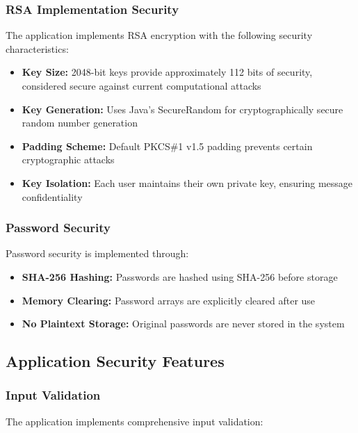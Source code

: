 \documentclass[12pt,a4paper]{article}
\begin{document}
\subsubsection{RSA Implementation Security}

The application implements RSA encryption with the following security characteristics:

\begin{itemize}
    \item \textbf{Key Size:} 2048-bit keys provide approximately 112 bits of security, considered secure against current computational attacks
    \item \textbf{Key Generation:} Uses Java's SecureRandom for cryptographically secure random number generation
    \item \textbf{Padding Scheme:} Default PKCS\#1 v1.5 padding prevents certain cryptographic attacks
    \item \textbf{Key Isolation:} Each user maintains their own private key, ensuring message confidentiality
\end{itemize}

\subsubsection{Password Security}

Password security is implemented through:

\begin{itemize}
    \item \textbf{SHA-256 Hashing:} Passwords are hashed using SHA-256 before storage
    \item \textbf{Memory Clearing:} Password arrays are explicitly cleared after use
    \item \textbf{No Plaintext Storage:} Original passwords are never stored in the system
\end{itemize}

\subsection{Application Security Features}

\subsubsection{Input Validation}

The application implements comprehensive input validation:
\end{document}
